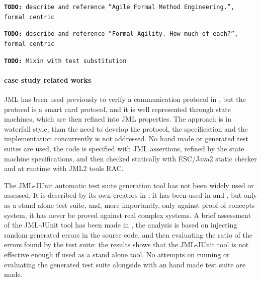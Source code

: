 \documentclass{article}
\newcommand{\todo}[1]{\texttt{\textbf{TODO:} #1}}
\begin{document}
\todo{describe and reference ``Agile Formal Method Engineering.'', formal centric}

\todo{describe and reference ``Formal Agility. How much of each?'', formal centric}

\todo{Mixin with test substitution}

\paragraph*{case study related works}

JML has been used previously to verify a communication protocol in \cite{Hubbers2004}, but the protocol is a smart card protocol, and it
is well represented through state machines, which are then refined into JML properties.  
The approach is in waterfall style; than the need to develop the protocol, the specification and the implementation concurrently is not addressed.  
No hand made or generated test suites are used, the code is specified with JML assertions, refined by the state machine specifications, and then checked statically with ESC/Java2 static checker\cite{CokKiniry04} and at runtime with JML2 tools RAC\cite{BurdyEtal05-STTT}.

The JML-JUnit automatic test suite generation tool has not been widely used or assessed. 
It is described by its own creators in \cite{Cheon2002,Cheon2004,Cheon2005}; it has been used in \cite{Oriat2004} and \cite{Cheon2005}, but only as a stand alone test suite, and, more importantly, only against proof of concepts system, it has never be proved against real complex systems.  
A brief assessment of the JML-JUnit tool has been made in \cite{Tan2004}, the analysis is based on injecting random generated errors in the source code, and then evaluating the ratio of the errors found by the test suite: the results shows that the JML-JUnit tool is not effective enough if used as a stand alone tool. 
No attempts on running or evaluating the generated test suite alongside with an hand made test suite are made.
\end{document}
